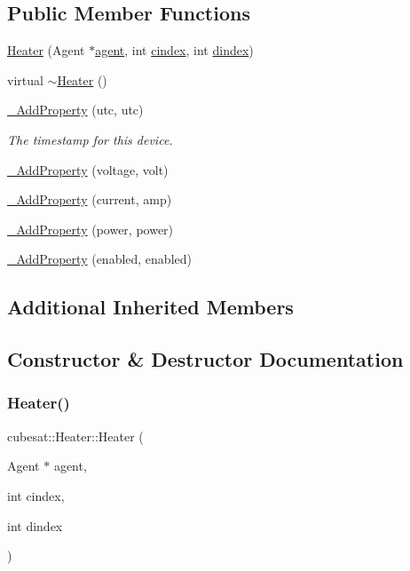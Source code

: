\subsection*{Public Member Functions}
\begin{DoxyCompactItemize}
\item 
\hyperlink{classcubesat_1_1Heater_ad66d360dfab4e5b0a3b1ca61167295f3}{Heater} (Agent $\ast$\hyperlink{classcubesat_1_1Device_a8499108eccaf7375bea8ead0182391a6}{agent}, int \hyperlink{classcubesat_1_1Device_a1deca725b01f8ef37e49662da6db4e53}{cindex}, int \hyperlink{classcubesat_1_1Device_a8a2b3d6d7400e6796c31705058172982}{dindex})
\item 
virtual \hyperlink{classcubesat_1_1Heater_a806f58caf9b9a74c20d1a426f5b339e4}{$\sim$\+Heater} ()
\item 
\hyperlink{classcubesat_1_1Heater_ab8f6bb7b9d46622677e6fbf5f70a05d1}{\+\_\+\+Add\+Property} (utc, utc)
\begin{DoxyCompactList}\small\item\em The timestamp for this device. \end{DoxyCompactList}\item 
\hyperlink{classcubesat_1_1Heater_a98f2dda11d692b8dae418764e6efd865}{\+\_\+\+Add\+Property} (voltage, volt)
\item 
\hyperlink{classcubesat_1_1Heater_a0ed9b05c35f70645dcbb759d221553b6}{\+\_\+\+Add\+Property} (current, amp)
\item 
\hyperlink{classcubesat_1_1Heater_a0fc3d2d1e7be729233941badd87132dc}{\+\_\+\+Add\+Property} (power, power)
\item 
\hyperlink{classcubesat_1_1Heater_aec846009881794b1594b21544730e52e}{\+\_\+\+Add\+Property} (enabled, enabled)
\end{DoxyCompactItemize}
\subsection*{Additional Inherited Members}


\subsection{Constructor \& Destructor Documentation}
\mbox{\label{classcubesat_1_1Heater_ad66d360dfab4e5b0a3b1ca61167295f3}} 
\subsubsection{\texorpdfstring{Heater()}{Heater()}}
{\footnotesize\ttfamily cubesat\+::\+Heater\+::\+Heater (\begin{DoxyParamCaption}\item[{Agent $\ast$}]{agent,  }\item[{int}]{cindex,  }\item[{int}]{dindex }\end{DoxyParamCaption})\hspace{0.3cm}{\ttfamily [inline]}}

